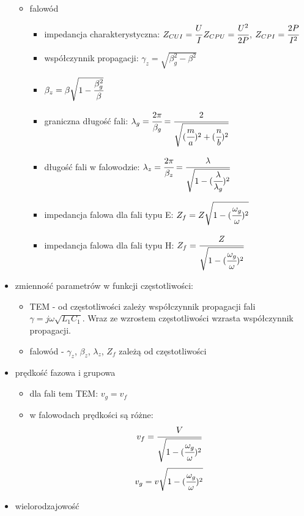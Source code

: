 \begin{solution}
\begin{itemize}
\begin{itemize}
\begin{itemize}
            \end{itemize}
          \item falowód 
            \begin{itemize} 
                \item impedancja charakterystyczna:
                $Z_{CUI}=\cfrac{U}{I}$$ $$Z_{CPU}=\cfrac{U^2}{2P}$, 
                $Z_{CPI}=\cfrac{2P}{I^2}$
                \item współczynnik propagacji: $\gamma_{z}=\sqrt{\beta_{g}^{2}-\beta^{2}}$
                \item $\beta_{z}=\beta\sqrt{1-\cfrac{\beta_{g}^{2}}{\beta}}$
                \item graniczna długość fali: $\lambda_{g}=\cfrac{2\pi}{\beta_{g}}=\cfrac{2}{\sqrt{(\cfrac{m}{a})^{2}+(\cfrac{n}{b})^{2}}} $
                \item długość fali w falowodzie:
                     $\lambda_{z}=\cfrac{2\pi}{\beta_{z}}=\cfrac{\lambda}{\sqrt{1-(\cfrac{\lambda}{\lambda_{g}})^{2}}} $            
                \item impedancja falowa dla fali typu E:
                     $Z_{f}=Z\sqrt{1-(\cfrac{\omega_{g}}{\omega})^{2}} $
                \item impedancja falowa dla fali typu H:
                    $Z_{f}=\cfrac{Z}{\sqrt{1-(\cfrac{\omega_{g}}{\omega})^{2}}} $
            \end{itemize} 
    \end{itemize}
\item zmienność parametrów w funkcji częstotliwości:
    \begin{itemize}
    \item TEM - od częstotliwości zależy współczynnik propagacji fali $\gamma=j\omega\sqrt{L_{1}C_{1}}$. 
            Wraz ze wzrostem częstotliwości wzrasta współczynnik propagacji.
    \item falowód - $\gamma_{z}$, $\beta_{z}$, $\lambda_z$, $Z_{f}$ zależą od częstotliwości      
    \end{itemize}
\item prędkość fazowa i grupowa
    \begin{itemize}
    \item dla fali tem TEM: $v_{g} = v_{f}$
    \item w falowodach prędkości są różne: $$v_{f}=\cfrac{V}{\sqrt{1-(\cfrac{\omega_{g}}{\omega})^2}} $$  
            $$v_{g}=v\sqrt{1-(\cfrac{\omega_{g}}{\omega})^{2}} $$
    \end{itemize}
\item wielorodzajowość

\end{itemize}
\end{solution}
